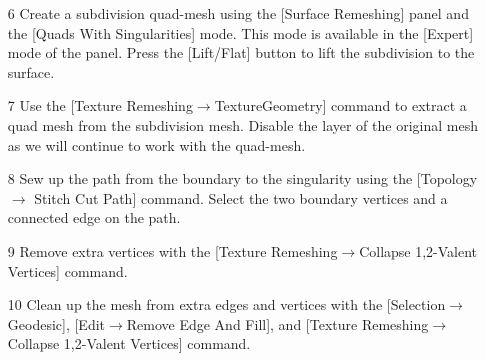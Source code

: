 \documentclass[Thesis.tex]{subfiles}
\begin{document}
\begin{itemize}
\begin{center}
\begin{minipage}{0.9\linewidth}
            \centering
\end{minipage}
\end{center}     
            
\item[6] Create a subdivision quad-mesh using the [Surface Remeshing] panel and the [Quads With Singularities] mode. This mode is available in the [Expert] mode of the panel. Press the [Lift/Flat] button to lift the subdivision to the surface.
\item[7] Use the [Texture Remeshing$\to$TextureGeometry] command to extract a quad mesh from the subdivision mesh. Disable the layer of the original mesh as we will continue to work with the quad-mesh.

\begin{center}
\begin{minipage}{0.9\linewidth}
            \centering
\end{minipage}
\end{center}                 
            
\item[8] Sew up the path from the boundary to the singularity using the [Topology$\to$ Stitch Cut Path] command. Select the two boundary vertices and a connected edge on the path.
\item[9] Remove extra vertices with the [Texture Remeshing$\to$Collapse 1,2-Valent Vertices] command.
\item[10] Clean up the mesh from extra edges and vertices with the [Selection$\to$Geodesic], [Edit$\to$Remove Edge And Fill], and [Texture Remeshing$\to$Collapse 1,2-Valent Vertices] command.


\end{itemize}
\end{document}
